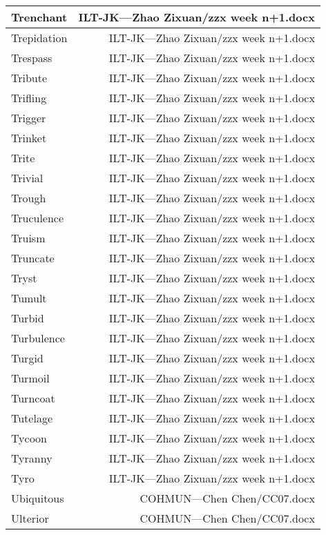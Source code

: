 \documentclass{article}
\begin{document}
\begin{center}
\begin{longtable}{|l|r|}
\hline
Trenchant  &  ILT-JK---Zhao Zixuan/zzx week n+1.docx\\  
\hline
Trepidation  &  ILT-JK---Zhao Zixuan/zzx week n+1.docx\\  
\hline
Trespass  &  ILT-JK---Zhao Zixuan/zzx week n+1.docx\\  
\hline
Tribute  &  ILT-JK---Zhao Zixuan/zzx week n+1.docx\\  
\hline
Trifling  &  ILT-JK---Zhao Zixuan/zzx week n+1.docx\\  
\hline
Trigger  &  ILT-JK---Zhao Zixuan/zzx week n+1.docx\\  
\hline
Trinket  &  ILT-JK---Zhao Zixuan/zzx week n+1.docx\\  
\hline
Trite  &  ILT-JK---Zhao Zixuan/zzx week n+1.docx\\  
\hline
Trivial  &  ILT-JK---Zhao Zixuan/zzx week n+1.docx\\  
\hline
Trough  &  ILT-JK---Zhao Zixuan/zzx week n+1.docx\\  
\hline
Truculence  &  ILT-JK---Zhao Zixuan/zzx week n+1.docx\\  
\hline
Truism  &  ILT-JK---Zhao Zixuan/zzx week n+1.docx\\  
\hline
Truncate  &  ILT-JK---Zhao Zixuan/zzx week n+1.docx\\  
\hline
Tryst  &  ILT-JK---Zhao Zixuan/zzx week n+1.docx\\  
\hline
Tumult  &  ILT-JK---Zhao Zixuan/zzx week n+1.docx\\  
\hline
Turbid  &  ILT-JK---Zhao Zixuan/zzx week n+1.docx\\  
\hline
Turbulence  &  ILT-JK---Zhao Zixuan/zzx week n+1.docx\\  
\hline
Turgid  &  ILT-JK---Zhao Zixuan/zzx week n+1.docx\\  
\hline
Turmoil  &  ILT-JK---Zhao Zixuan/zzx week n+1.docx\\  
\hline
Turncoat  &  ILT-JK---Zhao Zixuan/zzx week n+1.docx\\  
\hline
Tutelage  &  ILT-JK---Zhao Zixuan/zzx week n+1.docx\\  
\hline
Tycoon  &  ILT-JK---Zhao Zixuan/zzx week n+1.docx\\  
\hline
Tyranny  &  ILT-JK---Zhao Zixuan/zzx week n+1.docx\\  
\hline
Tyro  &  ILT-JK---Zhao Zixuan/zzx week n+1.docx\\  
\hline
Ubiquitous  &  COHMUN---Chen Chen/CC07.docx\\  
\hline
Ulterior  &  COHMUN---Chen Chen/CC07.docx\\  

\end{longtable}
\end{center}
\end{document}
